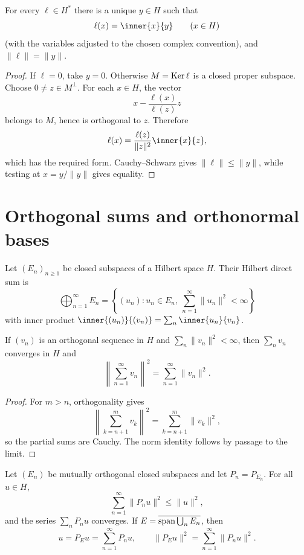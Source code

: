 \begin{notetheorem}
For every $\ell\in H^*$ there is a unique $y\in H$ such that
\[
  \ell(x)=\inner{x}{y}
  \qquad(x\in H)
\]
(with the variables adjusted to the chosen complex convention), and
$\|\ell\|=\|y\|$.
\end{notetheorem}

\begin{proof}
If $\ell=0$, take $y=0$.  Otherwise $M=\operatorname{Ker}\ell$ is a closed proper subspace.
Choose $0\ne z\in M^\perp$.  For each $x\in H$, the vector
\[
  x-\frac{\ell(x)}{\ell(z)}z
\]
belongs to $M$, hence is orthogonal to $z$.  Therefore
\[
  \ell(x)=\frac{\ell(z)}{\|z\|^2}\inner{x}{z},
\]
which has the required form.  Cauchy--Schwarz gives
$\|\ell\|\le\|y\|$, while testing at $x=y/\|y\|$ gives equality.
\end{proof}

\section{Orthogonal sums and orthonormal bases}

\begin{notedefinition}
Let $(E_n)_{n\ge1}$ be closed subspaces of a Hilbert space $H$.  Their
Hilbert direct sum is
\[
  \bigoplus_{n=1}^{\infty}E_n
  =\left\{(u_n):u_n\in E_n,
                 \ \sum_{n=1}^{\infty}\|u_n\|^2<\infty\right\}
\]
with inner product
$\inner{(u_n)}{(v_n)}=\sum_n\inner{u_n}{v_n}$.
\end{notedefinition}

\begin{notelemma}
If $(v_n)$ is an orthogonal sequence in $H$ and
$\sum_n\|v_n\|^2<\infty$, then $\sum_nv_n$ converges in $H$ and
\[
  \left\|\sum_{n=1}^{\infty}v_n\right\|^2
  =\sum_{n=1}^{\infty}\|v_n\|^2.
\]
\end{notelemma}

\begin{proof}
For $m>n$, orthogonality gives
\[
  \left\|\sum_{k=n+1}^m v_k\right\|^2
  =\sum_{k=n+1}^m\|v_k\|^2,
\]
so the partial sums are Cauchy.  The norm identity follows by passage to the
limit.
\end{proof}

\begin{notetheorem}
Let $(E_n)$ be mutually orthogonal closed subspaces and let $P_n=P_{E_n}$.  For
all $u\in H$,
\[
  \sum_{n=1}^{\infty}\|P_nu\|^2\le\|u\|^2,
\]
and the series $\sum_nP_nu$ converges.  If
$E=\overline{\operatorname{span}\bigcup_nE_n}$, then
\[
  u=P_Eu=\sum_{n=1}^{\infty}P_nu,
  \qquad
  \|P_Eu\|^2=\sum_{n=1}^{\infty}\|P_nu\|^2.
\]
\end{notetheorem}

